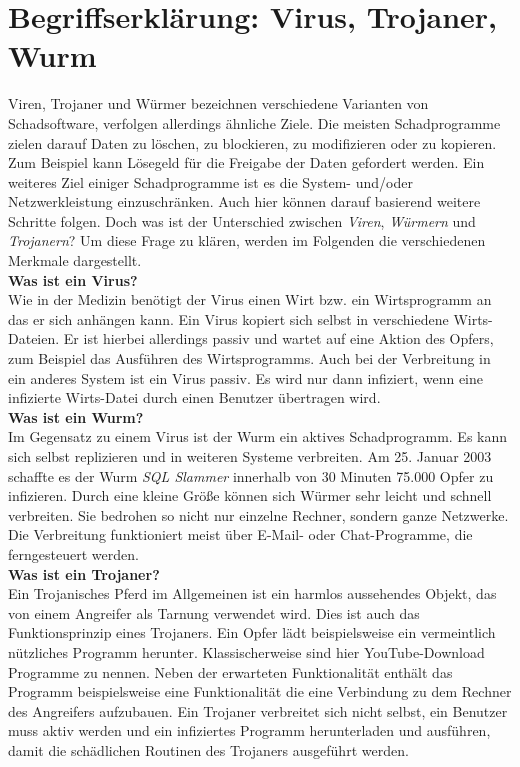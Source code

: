 \section{Begriffserklärung: Virus, Trojaner, Wurm}\label{sec:abgrenzung}
Viren, Trojaner und Würmer bezeichnen verschiedene Varianten von Schadsoftware,
verfolgen allerdings ähnliche Ziele.
Die meisten Schadprogramme zielen darauf Daten zu löschen, zu blockieren, zu modifizieren oder zu kopieren.
Zum Beispiel kann Lösegeld für die Freigabe der Daten gefordert werden.
Ein weiteres Ziel einiger Schadprogramme ist es die System- und/oder Netzwerkleistung
einzuschränken. Auch hier können darauf basierend weitere Schritte folgen.
Doch was ist der Unterschied zwischen \textit{Viren}, \textit{Würmern} und \textit{Trojanern}?
Um diese Frage zu klären, werden im Folgenden die verschiedenen Merkmale dargestellt.
\cite{KASTRO}\\

\textbf{Was ist ein Virus?}\\
Wie in der Medizin benötigt der Virus einen Wirt bzw. ein Wirtsprogramm an das 
er sich anhängen kann. Ein Virus kopiert sich selbst in verschiedene 
Wirts-Dateien. Er ist hierbei allerdings passiv und wartet auf eine Aktion des Opfers, 
zum Beispiel das Ausführen des Wirtsprogramms. Auch bei der Verbreitung in ein anderes
System ist ein Virus passiv. Es wird nur dann infiziert, wenn
eine infizierte Wirts-Datei durch einen Benutzer übertragen wird. \\

\textbf{Was ist ein Wurm?}\\
Im Gegensatz zu einem Virus ist der Wurm ein aktives Schadprogramm. Es kann sich
selbst replizieren und in weiteren Systeme verbreiten. Am 25. Januar 2003 schaffte es 
der Wurm \textit{SQL Slammer} innerhalb von 30 Minuten 75.000 Opfer zu infizieren. Durch
eine kleine Größe können sich Würmer sehr leicht und schnell verbreiten. Sie
bedrohen so nicht nur einzelne Rechner, sondern ganze Netzwerke. Die Verbreitung
funktioniert meist über E-Mail- oder Chat-Programme, die ferngesteuert werden.\\

\textbf{Was ist ein Trojaner?}\\
Ein Trojanisches Pferd im Allgemeinen ist ein harmlos aussehendes Objekt, das von
einem Angreifer als Tarnung verwendet wird. Dies ist auch das Funktionsprinzip eines Trojaners. 
Ein Opfer lädt beispielsweise ein vermeintlich nützliches Programm herunter.
Klassischerweise sind hier YouTube-Download Programme zu nennen.
Neben der erwarteten Funktionalität enthält
das Programm beispielsweise eine Funktionalität die eine Verbindung zu dem Rechner
des Angreifers aufzubauen. Ein Trojaner verbreitet sich nicht selbst, ein Benutzer 
muss aktiv werden und ein infiziertes Programm herunterladen und ausführen, damit die
schädlichen Routinen des Trojaners ausgeführt werden.
\cite{ABGVT}